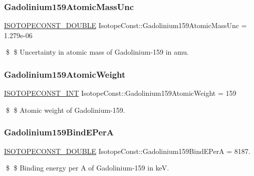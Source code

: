 \subsubsection{\texorpdfstring{Gadolinium159\+Atomic\+Mass\+Unc}{Gadolinium159AtomicMassUnc}}
{\footnotesize\ttfamily \mbox{\hyperlink{group___isotope_const-_macros_ga8f45a7272ce02c0b4c65c44636ed719a}{I\+S\+O\+T\+O\+P\+E\+C\+O\+N\+S\+T\+\_\+\+D\+O\+U\+B\+LE}} Isotope\+Const\+::\+Gadolinium159\+Atomic\+Mass\+Unc = 1.\+279e-\/06}

\$ \$ Uncertainty in atomic mass of Gadolinium-\/159 in amu. \mbox{\label{group___isotope_const-_gadolinium-_gd159_ga788e6bed20981ece0e4496b8e4968c50}} 
\subsubsection{\texorpdfstring{Gadolinium159\+Atomic\+Weight}{Gadolinium159AtomicWeight}}
{\footnotesize\ttfamily \mbox{\hyperlink{group___isotope_const-_macros_ga5f18360b3e99483a35c32d789e62621c}{I\+S\+O\+T\+O\+P\+E\+C\+O\+N\+S\+T\+\_\+\+I\+NT}} Isotope\+Const\+::\+Gadolinium159\+Atomic\+Weight = 159}

\$ \$ Atomic weight of Gadolinium-\/159. \mbox{\label{group___isotope_const-_gadolinium-_gd159_ga5165a8f0da15954f0ca4034e441a82af}} 
\subsubsection{\texorpdfstring{Gadolinium159\+Bind\+E\+PerA}{Gadolinium159BindEPerA}}
{\footnotesize\ttfamily \mbox{\hyperlink{group___isotope_const-_macros_ga8f45a7272ce02c0b4c65c44636ed719a}{I\+S\+O\+T\+O\+P\+E\+C\+O\+N\+S\+T\+\_\+\+D\+O\+U\+B\+LE}} Isotope\+Const\+::\+Gadolinium159\+Bind\+E\+PerA = 8187.}

\$ \$ Binding energy per A of Gadolinium-\/159 in keV. \mbox{\label{group___isotope_const-_gadolinium-_gd159_ga420acc24cc1536eea6f994cbfffc22f7}} 
